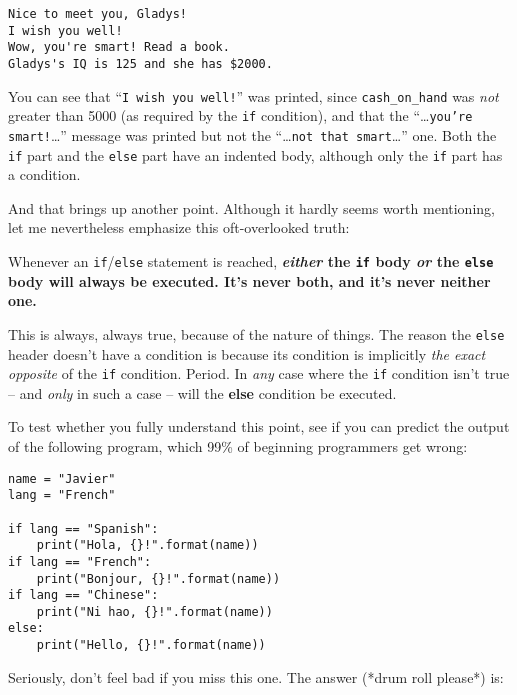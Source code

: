 \begin{Verbatim}[fontsize=\small,samepage=true,frame=leftline,framesep=5mm,framerule=1mm]
Nice to meet you, Gladys!
I wish you well!
Wow, you're smart! Read a book.
Gladys's IQ is 125 and she has $2000.
\end{Verbatim}

You can see that ``\texttt{I wish you well!}'' was printed, since
\texttt{cash\_on\_hand} was \textit{not} greater than 5000 (as required by the
\texttt{if} condition), and that the ``\dots\texttt{you're smart!}\dots''
message was printed but not the ``\dots\texttt{not that smart}\dots'' one.
Both the \texttt{if} part and the \texttt{else} part have an indented body,
although only the \texttt{if} part has a condition.

And that brings up another point. Although it hardly seems worth mentioning,
let me nevertheless emphasize this oft-overlooked truth:

\begin{shaded}
Whenever an \texttt{if}/\texttt{else} statement is reached,
\textbf{\textit{either} the \texttt{if} body \textit{or} the \texttt{else}
body will always be executed. It's never both, and it's never neither one.}
\end{shaded}

This is always, always true, because of the nature of things. The reason the
\texttt{else} header doesn't have a condition is because its condition is
implicitly \textit{the exact opposite} of the \texttt{if} condition. Period. In
\textit{any} case where the \texttt{if} condition isn't true -- and
\textit{only} in such a case -- will the \textbf{else} condition be executed.

To test whether you fully understand this point, see if you can predict the
output of the following program, which 99\% of beginning programmers get wrong:

\begin{Verbatim}[fontsize=\small,samepage=true,frame=single,framesep=3mm]
name = "Javier"
lang = "French"

if lang == "Spanish":
    print("Hola, {}!".format(name))
if lang == "French":
    print("Bonjour, {}!".format(name))
if lang == "Chinese":
    print("Ni hao, {}!".format(name))
else:
    print("Hello, {}!".format(name))
\end{Verbatim}
\vspace{-.2in}

Seriously, don't feel bad if you miss this one. The answer (*drum roll please*)
is:

